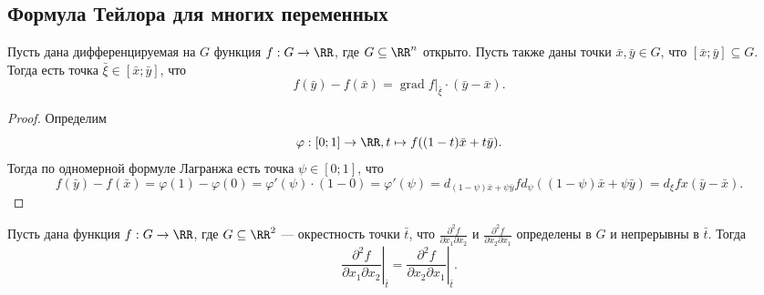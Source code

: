 \documentclass[12pt,a4paper]{article}
\DeclareMathOperator{\grad}{grad}
\begin{document}
    \subsection{Формула Тейлора для многих переменных}

    \begin{theorem}
        Пусть дана дифференцируемая на $G$ функция $f: G \to \RR$, где $G \subseteq \RR^n$ открыто. Пусть также даны точки $\bar{x}, \bar{y} \in G$, что $[\bar{x}; \bar{y}] \subseteq G$. Тогда есть точка $\bar{\xi} \in [\bar{x}; \bar{y}]$, что
        \[f(\bar{y}) - f(\bar{x}) = \grad f|_{\bar{\xi}} \cdot (\bar{y} - \bar{x}).\]
    \end{theorem}

    \begin{proof}
        Определим
        \[\varphi: [0; 1] \to \RR, t \mapsto f((1-t)\bar{x} + t\bar{y}).\]
        Тогда по одномерной формуле Лагранжа есть точка $\psi \in [0; 1]$, что
        \[
            f(\bar{y}) - f(\bar{x})
            = \varphi(1) - \varphi(0)
            = \varphi'(\psi) \cdot (1-0)
            = \varphi'(\psi)
            = d_{(1-\psi)\bar{x} + \psi\bar{y}}f d_{\psi}((1-\psi)\bar{x} + \psi\bar{y})
            = d_{\xi}f x(\bar{y} - \bar{x}).
        \]
    \end{proof}

    \begin{theorem}
        Пусть дана функция $f: G \to \RR$, где $G \subseteq \RR^2$ --- окрестность точки $\bar{t}$, что $\frac{\partial^2 f}{\partial x_1 \partial x_2}$ и $\frac{\partial^2 f}{\partial x_2 \partial x_1}$ определены в $G$ и непрерывны в $\bar{t}$. Тогда
        \[\left. \frac{\partial^2 f}{\partial x_1 \partial x_2} \right|_{\bar{t}} = \left. \frac{\partial^2 f}{\partial x_2 \partial x_1} \right|_{\bar{t}}.\]
    \end{theorem}
\end{document}
